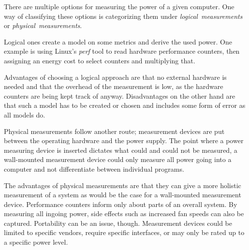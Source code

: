 There are multiple options for measuring the power of a given computer. One way of classifying these options is categorizing them under \emph{logical~measurements} or \emph{physical~measurements}.

Logical ones create a model on some metrics and derive the used power. One example is using Linux's \emph{perf} tool to read hardware performance counters, then assigning an energy cost to select counters and multiplying that. 

Advantages of choosing a logical approach are that no external hardware is needed and that the overhead of the measurement is low, as the hardware counters are being kept track of anyway. 
Disadvantages on the other hand are that such a model has to be created or chosen and includes some form of error as all models do.

Physical measurements follow another route; measurement devices are put between the operating hardware and the power supply. 
The point where a power measuring device is inserted dictates what could and could not be measured, a wall-mounted measurement device could only measure all power going into a computer and not differentiate between individual programs.

The advantages of physical measurements are that they can give a more holistic measurement of a system as would be the case for a wall-mounted measurement device. 
Performance counters inform only about parts of an overall system.
By measuring all ingoing power, side effects such as increased fan speeds can also be captured.
Portability can be an issue, though. 
Measurement devices could be limited to specific vendors, require specific interfaces, or may only be rated up to a specific power level. 
